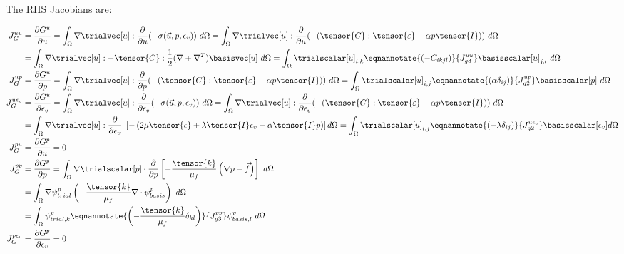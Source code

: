 The RHS Jacobians are:

\begin{align}
J_G^{uu} &= \frac{\partial G^u}{\partial u} = \int_{\Omega} \nabla \trialvec[u] : \frac{\partial}{\partial u} (- \sigma(\vec{u},p,\epsilon_{v})) \
d\Omega = \int_{\Omega} \nabla \trialvec[u] : \frac{\partial}{\partial u} (-(\tensor{C}:\tensor{\varepsilon} -\alpha p \tensor{I})) \ d\Omega \\
&= \int_{\Omega} \nabla \trialvec[u] : -\tensor{C}: \frac{1}{2} (\nabla + \nabla^T) \basisvec[u] \ d\Omega = \int_{\Omega} \trialscalar[u]_{i,k}
\eqnannotate{\left(-C_{ikjl}\right)}{J_{g3}^{uu}} \basisscalar[u]_{j,l} \ d\Omega
\\
%
J_G^{up} &= \frac{\partial G^u}{\partial p} = \int_{\Omega} \nabla \trialvec[u] : \frac{\partial}{\partial p}(-(\tensor{C}:\tensor{\varepsilon} -\alpha p \tensor{I})) \ d\Omega =
\int_{\Omega} \trialscalar[u]_{i,j} \eqnannotate{\left(\alpha \delta_{ij}\right)}{J_{g2}^{up}} \basisscalar[p] \ d\Omega \\
%
J_G^{u\epsilon_{v}} &= \frac{\partial G^u}{\partial \epsilon_{v}} = \int_{\Omega} \nabla \trialvec[u] : \frac{\partial}{\partial \epsilon_{v}}
(-\sigma(\vec{u},p,\epsilon_{v})) \ d\Omega = \int_{\Omega} \nabla \trialvec[u] :
\frac{\partial}{\partial \epsilon_{v}} (-(\tensor{C}:\tensor{\varepsilon} -\alpha p \tensor{I})) \ d\Omega \\
&= \int_{\Omega} \nabla \trialvec[u] : \frac{\partial}{\partial \epsilon_{v}} \
\left[-\left(2 \mu \tensor{\epsilon} + \lambda \tensor{I} \epsilon_{v} - \alpha \tensor{I} p \right) \right] d\Omega =
\int_{\Omega} \trialscalar[u]_{i,j} \eqnannotate{\left(-\lambda \delta_{ij} \right)}{J_{g2}^{u \epsilon_{v}}} \basisscalar[\epsilon_{v}] d\Omega  \\
%
J_G^{pu} &= \frac{\partial G^p}{\partial u} = 0 \\
%
J_G^{pp} &= \frac{\partial G^p}{\partial p} = \int_{\Omega} \nabla
\trialscalar[p] \cdot \frac{\partial}{\partial p} \left[-\frac{\tensor{k}}{\mu_{f}} \left(\nabla p -
\vec{f} \right) \right] \ d\Omega \\
&= \int_{\Omega} \nabla \psi_{trial}^ p \left(-\frac{\tensor{k}}{\mu_{f}}
\nabla \cdot \psi_{basis}^p \right) \ d\Omega \\
&= \int_{\Omega} \psi_{trial,k}^p \eqnannotate{\left(-\frac{\tensor{k}}{\mu_{f}}
\delta_{kl}\right)}{J_{g3}^{pp}}
\psi_{basis,l}^p \ d\Omega \\
%
J_G^{p\epsilon_{v}} &= \frac{\partial G^p}{\partial \epsilon_{v}} = 0 \\

\end{align}

